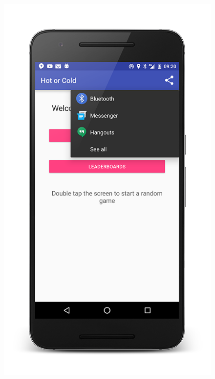 \documentclass[10pt, a4paper]{article}
\begin{document}
\begin{figure}[!htb]
  \includegraphics[width=1.0\textwidth]{phone_shareprovider_1}
  \caption{}
\endminipage\hfill
{}%

\end{figure}
\end{document}
